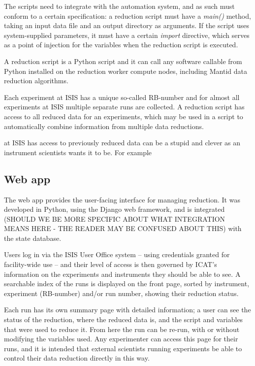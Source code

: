 \documentclass[twocolumn]{article}
\begin{document}
The scripts need to integrate with the automation system, and
as such must conform to a certain specification: a reduction script must have a
\emph{main()} method, taking an input data file and an output directory as
arguments. If the script uses system-supplied parameters, it must have a
certain \emph{import} directive, which serves as a point of injection
for the variables when the reduction script is executed.

A reduction script is a Python script and it can call any software 
callable from Python installed on the reduction worker compute nodes,
including Mantid data reduction algorithms.

Each experiment at ISIS has a unique so-called RB-number
and for almost all experiments at ISIS multiple separate runs are collected.
A reduction script has access to all reduced data for an experiments, which 
may be used in a script to automatically combine information from multiple 
data reductions.

at ISIS has access to previously reduced data can be a stupid and clever as an instrument
scientists wants it to be. For example

\subsection{Web app}\label{web-app}

The web app provides the user-facing interface for managing reduction.
It was developed in Python, using the Django web framework, and is
integrated (SHOULD WE BE MORE SPECIFIC ABOUT WHAT INTEGRATION
MEANS HERE - THE READER MAY BE CONFUSED ABOUT THIS) with the state database.

Users log in via the ISIS User Office system -- using credentials 
granted for facility-wide use -- and their level of access is then 
governed by ICAT's information on the experiments and instruments they 
should be able to see. A searchable index of the runs is displayed on the front page, sorted
by instrument, experiment (RB-number) and/or run number, showing their reduction
status.

Each run has its own summary page with detailed information; a user can
see the status of the reduction, where the reduced data is, and the
script and variables that were used to reduce it. From here the run can
be re-run, with or without modifying the variables used. Any
experimenter can access this page for their runs, and it is intended that
external scientists running experiments be able to control their data
reduction directly in this way.
\end{document}
